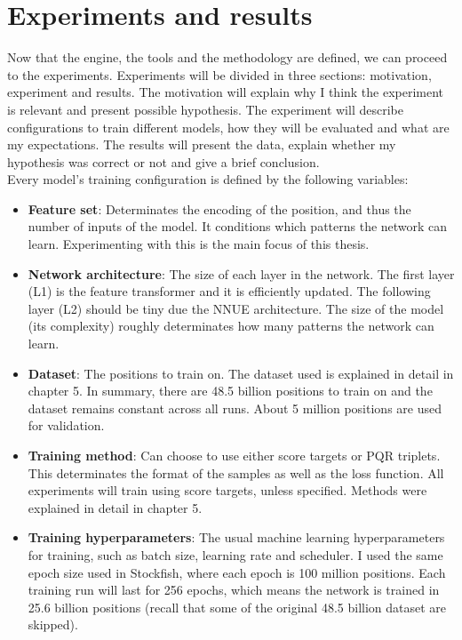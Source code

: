 \newcommand{\depiction}[1]{\parbox{0.7cm}{\texttt{[image: ../assets/depictions/\#1.pdf]}}}
\newcommand{\depictionSM}[1]{\parbox{0.6cm}{\texttt{[image: ../assets/depictions/\#1.pdf]}}}


\section{Experiments and results}

Now that the engine, the tools and the methodology are defined, we can proceed to the experiments. Experiments will be divided in three sections: motivation, experiment and results. The motivation will explain why I think the experiment is relevant and present possible hypothesis. The experiment will describe configurations to train different models, how they will be evaluated and what are my expectations. The results will present the data, explain whether my hypothesis was correct or not and give a brief conclusion. \\

Every model's training configuration is defined by the following variables:

\begin{itemize}
\item \textbf{Feature set}: Determinates the encoding of the position, and thus the number of inputs of the model. It conditions which patterns the network can learn. Experimenting with this is the main focus of this thesis.

\item \textbf{Network architecture}: The size of each layer in the network. The first layer (L1) is the feature transformer and it is efficiently updated. The following layer (L2) should be tiny due the NNUE architecture. The size of the model (its complexity) roughly determinates how many patterns the network can learn.

\item \textbf{Dataset}: The positions to train on. The dataset used is explained in detail in chapter 5. In summary, there are 48.5 billion positions to train on and the dataset remains constant across all runs. About 5 million positions are used for validation.

\item \textbf{Training method}: Can choose to use either score targets or PQR triplets. This determinates the format of the samples as well as the loss function. All experiments will train using score targets, unless specified. Methods were explained in detail in chapter 5.

\item \textbf{Training hyperparameters}: The usual machine learning hyperparameters for training, such as batch size, learning rate and scheduler. I used the same epoch size used in Stockfish, where each epoch is 100 million positions. Each training run will last for 256 epochs, which means the network is trained in 25.6 billion positions (recall that some of the original 48.5 billion dataset are skipped).
\end{itemize}

